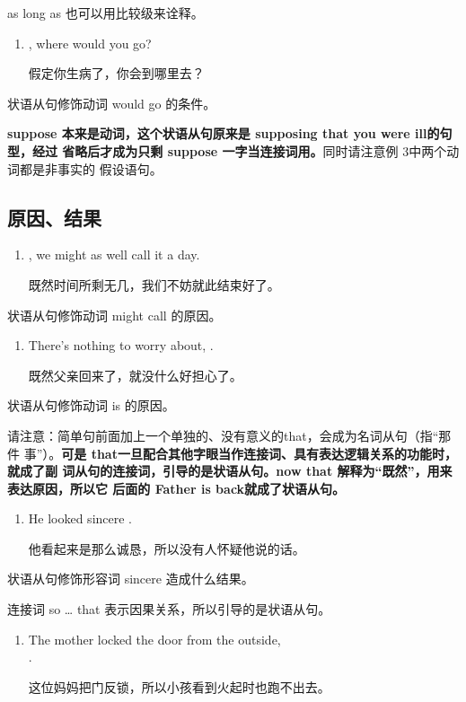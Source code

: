 as long as 也可以用比较级来诠释。
\begin{enumerate}[resume]
\item {} , where would you go?

  假定你生病了，你会到哪里去？
\end{enumerate}
状语从句修饰动词 would go 的条件。

\textbf{suppose 本来是动词，这个状语从句原来是 supposing that you were ill的句型，经过
  省略后才成为只剩 suppose 一字当连接词用。}同时请注意例 3中两个动词都是非事实的
假设语句。

\subsection{原因、结果}

\begin{enumerate}
\item {} , we might as
  well call it a day.

  既然时间所剩无几，我们不妨就此结束好了。
\end{enumerate}
状语从句修饰动词 might call 的原因。

\begin{enumerate}[resume]
\item There's nothing to worry about,  .

  既然父亲回来了，就没什么好担心了。
\end{enumerate}
状语从句修饰动词 is 的原因。

请注意：简单句前面加上一个单独的、没有意义的that，会成为名词从句（指“那件
事”）。\textbf{可是 that一旦配合其他字眼当作连接词、具有表达逻辑关系的功能时，就成了副
  词从句的连接词，引导的是状语从句。now that 解释为“既然”，用来表达原因，所以它
  后面的 Father is back就成了状语从句。}

\begin{enumerate}[resume]
\item He looked  sincere  .

他看起来是那么诚恳，所以没有人怀疑他说的话。
\end{enumerate}
状语从句修饰形容词 sincere 造成什么结果。

连接词 so \ldots{} that 表示因果关系，所以引导的是状语从句。

\begin{enumerate}[resume]
\item The mother locked the door from the outside,  \\
  .

  这位妈妈把门反锁，所以小孩看到火起时也跑不出去。
\end{enumerate}

